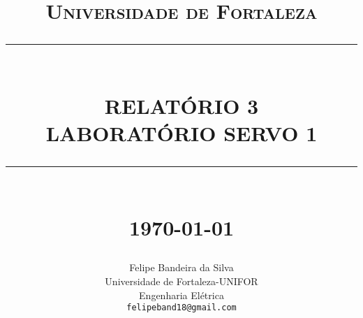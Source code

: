 %




\newcommand{\HRule}[1]{\rule{\linewidth}{#1}} 	%

\makeatletter							%
\def\printtitle{%
    {\centering \@title\par}}
\makeatother									

\makeatletter							%
\def\printauthor{%
    {\centering \large \@author}}				
\makeatother							

\title{	\normalsize \textsc{Universidade de Fortaleza} 	%
		 	\\[2.0cm]													%
			\HRule{0.5pt} \\										%
			\LARGE \textbf{\uppercase{Relatório 3\\Laboratório Servo 1}}	%
			\HRule{2pt} \\ [0.5cm]								%
			\normalsize \today									%
		}

\author{
		Felipe Bandeira da Silva\\	
		Universidade de Fortaleza-UNIFOR\\	
		Engenharia Elétrica\\
        \texttt{felipeband18@gmail.com} \\
}


